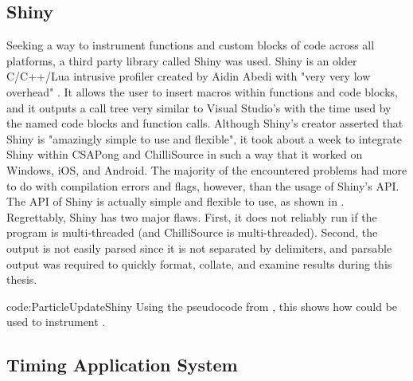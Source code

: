 \subsection{Shiny}\label{ssec:instr_timing_system_shiny}

Seeking a way to instrument functions and custom blocks of code across all platforms, a third party library called Shiny was used. Shiny is an older C/C++/Lua intrusive profiler created by Aidin Abedi with "very very low overhead" \cite{AbediShinyProfiler}. It allows the user to insert macros within functions and code blocks, and it outputs a call tree very similar to Visual Studio's with the time used by the named code blocks and function calls. Although Shiny's creator asserted that Shiny is "amazingly simple to use and flexible", it took about a week to integrate Shiny within CSAPong and ChilliSource in such a way that it worked on Windows, iOS, and Android. The majority of the encountered problems had more to do with compilation errors and flags, however, than the usage of Shiny's API. The API of Shiny is actually simple and flexible to use, as shown in . Regrettably, Shiny has two major flaws. First, it does not reliably run if the program is multi-threaded (and ChilliSource is multi-threaded). Second, the output is not easily parsed since it is not separated by delimiters, and parsable output was required to quickly format, collate, and examine results during this thesis.

{code:ParticleUpdateShiny}
{Using the pseudocode from , this shows how  could be used to instrument . }

\vspace{-0.5cm}
\subsection{Timing Application System}\label{ssec:instr_timing_system_custom}

